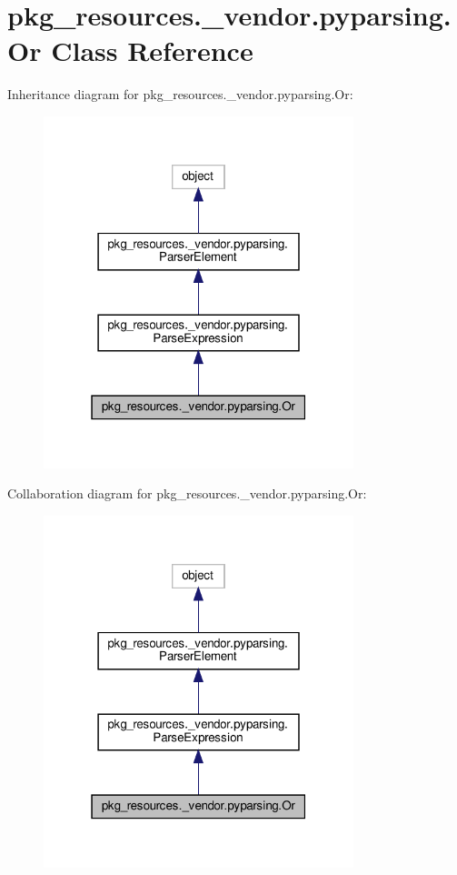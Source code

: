 \hypertarget{classpkg__resources_1_1__vendor_1_1pyparsing_1_1Or}{}\section{pkg\+\_\+resources.\+\_\+vendor.\+pyparsing.\+Or Class Reference}
\label{classpkg__resources_1_1__vendor_1_1pyparsing_1_1Or}


Inheritance diagram for pkg\+\_\+resources.\+\_\+vendor.\+pyparsing.\+Or\+:
\nopagebreak
\begin{figure}[H]
\begin{center}
\leavevmode
\includegraphics[width=256pt]{classpkg__resources_1_1__vendor_1_1pyparsing_1_1Or__inherit__graph}
\end{center}
\end{figure}


Collaboration diagram for pkg\+\_\+resources.\+\_\+vendor.\+pyparsing.\+Or\+:
\nopagebreak
\begin{figure}[H]
\begin{center}
\leavevmode
\includegraphics[width=256pt]{classpkg__resources_1_1__vendor_1_1pyparsing_1_1Or__coll__graph}
\end{center}
\end{figure}
